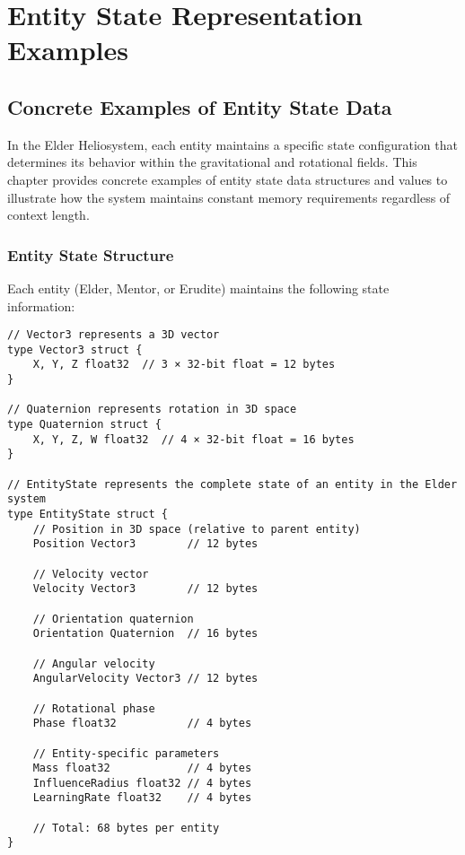 \chapter{Entity State Representation Examples}

\section{Concrete Examples of Entity State Data}

In the Elder Heliosystem, each entity maintains a specific state configuration that determines its behavior within the gravitational and rotational fields. This chapter provides concrete examples of entity state data structures and values to illustrate how the system maintains constant memory requirements regardless of context length.

\subsection{Entity State Structure}

Each entity (Elder, Mentor, or Erudite) maintains the following state information:

\begin{tcolorbox}[colback=CodeBackground, colframe=DarkGray, title=Entity State Data Structure in Go, fonttitle=\bfseries]
\begin{verbatim}
// Vector3 represents a 3D vector
type Vector3 struct {
    X, Y, Z float32  // 3 × 32-bit float = 12 bytes
}

// Quaternion represents rotation in 3D space
type Quaternion struct {
    X, Y, Z, W float32  // 4 × 32-bit float = 16 bytes
}

// EntityState represents the complete state of an entity in the Elder system
type EntityState struct {
    // Position in 3D space (relative to parent entity)
    Position Vector3        // 12 bytes
    
    // Velocity vector
    Velocity Vector3        // 12 bytes
    
    // Orientation quaternion
    Orientation Quaternion  // 16 bytes
    
    // Angular velocity
    AngularVelocity Vector3 // 12 bytes
    
    // Rotational phase
    Phase float32           // 4 bytes
    
    // Entity-specific parameters
    Mass float32            // 4 bytes
    InfluenceRadius float32 // 4 bytes
    LearningRate float32    // 4 bytes
    
    // Total: 68 bytes per entity
}
\end{verbatim}
\end{tcolorbox}

